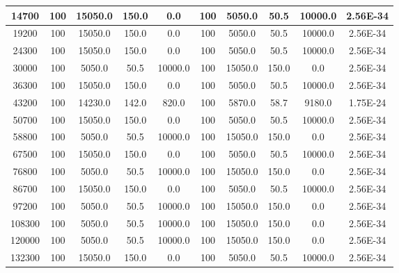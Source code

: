 \begin{tabular}{|c|c|c|c|c|c|c|c|c|c|}
14700 & 100 & 15050.0 & 150.0 & 0.0 & 100 & 5050.0 & 50.5 & 10000.0 & 2.56E-34\\ \hline
19200 & 100 & 15050.0 & 150.0 & 0.0 & 100 & 5050.0 & 50.5 & 10000.0 & 2.56E-34\\ \hline
24300 & 100 & 15050.0 & 150.0 & 0.0 & 100 & 5050.0 & 50.5 & 10000.0 & 2.56E-34\\ \hline
30000 & 100 & 5050.0 & 50.5 & 10000.0 & 100 & 15050.0 & 150.0 & 0.0 & 2.56E-34\\ \hline
36300 & 100 & 15050.0 & 150.0 & 0.0 & 100 & 5050.0 & 50.5 & 10000.0 & 2.56E-34\\ \hline
43200 & 100 & 14230.0 & 142.0 & 820.0 & 100 & 5870.0 & 58.7 & 9180.0 & 1.75E-24\\ \hline
50700 & 100 & 15050.0 & 150.0 & 0.0 & 100 & 5050.0 & 50.5 & 10000.0 & 2.56E-34\\ \hline
58800 & 100 & 5050.0 & 50.5 & 10000.0 & 100 & 15050.0 & 150.0 & 0.0 & 2.56E-34\\ \hline
67500 & 100 & 15050.0 & 150.0 & 0.0 & 100 & 5050.0 & 50.5 & 10000.0 & 2.56E-34\\ \hline
76800 & 100 & 5050.0 & 50.5 & 10000.0 & 100 & 15050.0 & 150.0 & 0.0 & 2.56E-34\\ \hline
86700 & 100 & 15050.0 & 150.0 & 0.0 & 100 & 5050.0 & 50.5 & 10000.0 & 2.56E-34\\ \hline
97200 & 100 & 5050.0 & 50.5 & 10000.0 & 100 & 15050.0 & 150.0 & 0.0 & 2.56E-34\\ \hline
108300 & 100 & 5050.0 & 50.5 & 10000.0 & 100 & 15050.0 & 150.0 & 0.0 & 2.56E-34\\ \hline
120000 & 100 & 5050.0 & 50.5 & 10000.0 & 100 & 15050.0 & 150.0 & 0.0 & 2.56E-34\\ \hline
132300 & 100 & 15050.0 & 150.0 & 0.0 & 100 & 5050.0 & 50.5 & 10000.0 & 2.56E-34\\ \hline
\end{tabular}